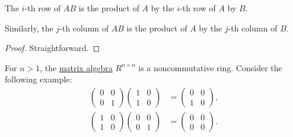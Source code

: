 \begin{proposition}\label{thm:columns_and_rows_of_matrix_product}
  The \( i \)-th row of \( AB \) is the product of \( A \) by the \( i \)-th row of \( A \) by \( B \).

  Similarly, the \( j \)-th column of \( AB \) is the product of \( A \) by the \( j \)-th column of \( B \).
\end{proposition}
\begin{proof}
  Straightforward.
\end{proof}

\begin{example}\label{ex:matrix_multiplication_is_noncommutative}
  For \( n > 1 \), the \hyperref[thm:matrix_algebra]{matrix algebra} \( R^{n \times n} \) is a noncommutative ring. Consider the following example:
  \begin{align*}
    \begin{pmatrix}
      0 & 0 \\
      0 & 1
    \end{pmatrix}
    \begin{pmatrix}
      1 & 0 \\
      1 & 0
    \end{pmatrix}
    &=
    \begin{pmatrix}
      0 & 0 \\
      1 & 0
    \end{pmatrix},
    \\
    \begin{pmatrix}
      1 & 0 \\
      1 & 0
    \end{pmatrix}
    \begin{pmatrix}
      0 & 0 \\
      0 & 1
    \end{pmatrix}
    &=
    \begin{pmatrix}
      0 & 0 \\
      0 & 0
    \end{pmatrix}.
  \end{align*}
\end{example}

